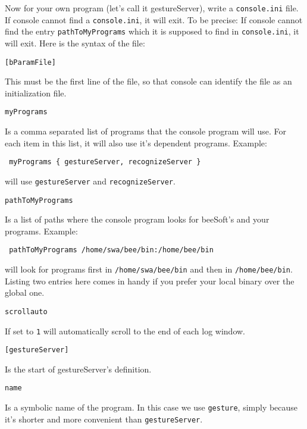\documentclass{article}
\begin{document}
Now for your own program (let's call it gestureServer), write a
\texttt{console.ini} file. If console cannot find a \texttt{console.ini}, it
will exit. To be precise: If console cannot find the entry
\texttt{pathToMyPrograms} which it is supposed to find in
\texttt{console.ini}, it will exit. Here is the syntax of the file:

\begin{description}
  
\item \texttt{[bParamFile]}
  
  This must be the first line of the file, so that console can identify the
  file as an initialization file.

\item \texttt{myPrograms}
  
  Is a comma separated list of programs that the console program will use. For
  each item in this list, it will also use it's dependent programs. Example:
  \begin{center}
    \texttt{ myPrograms \{ gestureServer, recognizeServer \} }
  \end{center}
  will use \texttt{gestureServer} and \texttt{recognizeServer}.
  
\item \texttt{pathToMyPrograms} 
  
  Is a list of paths where the console program looks for beeSoft's and your
  programs. Example:
  \begin{center}
    \texttt{ pathToMyPrograms /home/swa/bee/bin:/home/bee/bin }
  \end{center}
  will look for programs first in \texttt{/home/swa/bee/bin} and then in
  \texttt{/home/bee/bin}. Listing two entries here comes in handy if you
  prefer your local binary over the global one.

\item \texttt{scrollauto}
  
  If set to \texttt{1} will automatically scroll to the end of each log
  window.

\item \texttt{[gestureServer]}
  
  Is the start of gestureServer's definition.
  
\item \texttt{name}
  
  Is a symbolic name of the program. In this case we use \texttt{gesture},
  simply because it's shorter and more convenient than \texttt{gestureServer}.


\end{description}
\end{document}
